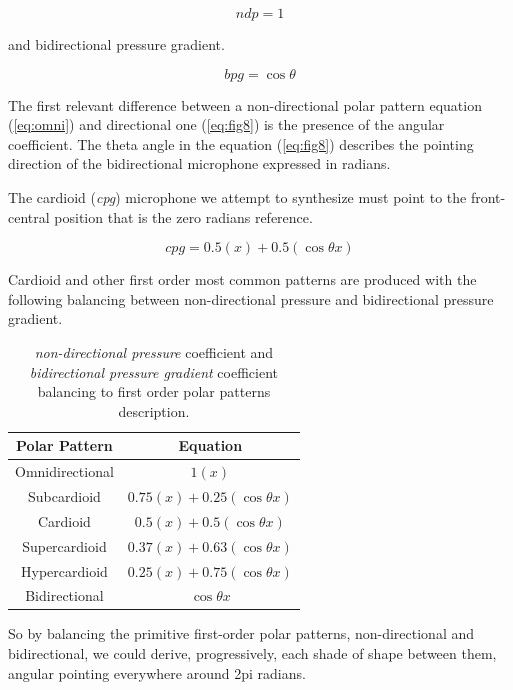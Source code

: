 \documentclass{article}
\begin{document}
\begin{equation}
ndp = 1
\label{eq:omni}
\end{equation}

and bidirectional pressure gradient.

\begin{equation}
bpg = \cos\theta
\label{eq:fig8}
\end{equation}

The first relevant difference between a non-directional polar pattern equation (\ref{eq:omni}) and directional one (\ref{eq:fig8}) is the presence of the angular coefficient. The theta angle in the equation (\ref{eq:fig8}) describes the pointing direction of the bidirectional microphone expressed in radians.

The cardioid (\emph{cpg}) microphone we attempt to synthesize must point to the front-central position that is the zero radians reference.

\begin{equation}
cpg = 0.5(x) + 0.5(\cos\theta x)
\label{eq:cardioid}
\end{equation}

Cardioid and other first order most common patterns are produced with the following balancing between non-directional pressure and bidirectional pressure gradient.

\begin{table}[h]
 \begin{center}
 \begin{tabular}{cc}
  Polar Pattern & Equation \\
  \hline
  Omnidirectional & $ 1(x) $ \\
  Subcardioid     & $ 0.75(x) + 0.25(\cos\theta x) $ \\
  Cardioid        & $ 0.5(x) + 0.5(\cos\theta x) $ \\
  Supercardioid   & $ 0.37(x) + 0.63(\cos\theta x) $ \\
  Hypercardioid   & $ 0.25(x) + 0.75(\cos\theta x) $ \\
  Bidirectional   & $ \cos\theta x $ \\
 \end{tabular}
\end{center}
 \caption{\emph{non-directional pressure} coefficient and \emph{bidirectional pressure gradient} coefficient balancing to first order polar patterns description.}
 \label{tab:example}
\end{table}

So by balancing the primitive first-order polar patterns, non-directional and bidirectional, we could derive, progressively, each shade of shape between them, angular pointing everywhere around 2pi radians.
\end{document}
